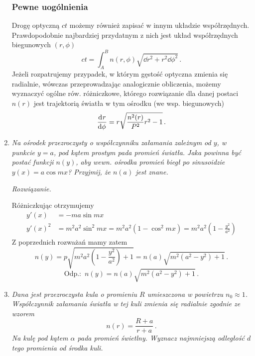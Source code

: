 \documentclass[../main.tex]{subfiles}
\begin{document}
\begin{enumerate}
\subsubsection*{Pewne uogólnienia}
Drogę optyczną \(ct\) możemy również zapisać w innym układzie współrzędnych. Prawdopodobnie
najbardziej przydatnym z nich jest układ współrzędnych biegunowych \((r,\phi)\)
\begin{equation*}
    ct=\int_{A}^{B}n(r,\phi)\sqrt{\dd{r}^2+r^2\dd{\phi}^2}\,.
\end{equation*}
Jeżeli rozpatrujemy przypadek, w którym gęstość optyczna zmienia się radialnie, wówczas
przeprowadzając analogicznie obliczenia, możemy wyznaczyć ogólne rów. różniczkowe, którego
rozwiązanie dla danej postaci \(n(r)\) jest trajektorią światła w tym ośrodku (we wsp. biegunowych)
\begin{equation*}
    \dv[]{r}{\phi}=r\sqrt{\frac{n^2(r)}{P^2}r^2-1}\,.
\end{equation*}

\item \textit{Na ośrodek przezroczysty o współczynniku załamania zależnym od \(y\), w punkcie
\(y=a\), pod kątem prostym pada promień światła. Jaka powinna być postać funkcji \(n(y)\), aby wewn.
ośrodka promień biegł po sinusoidzie \(y(x)=a\cos mx\)? Przyjmij, że \(n(a)\) jest znane.}
\medskip

\textit{Rozwiązanie.}
\medskip

Różniczkując otrzymujemy 
\begin{equation*}
\begin{split}
    y'(x)&=-ma\sin mx\\
    y'(x)^2&=m^2a^2\sin^2mx=m^2a^2(1-\cos^2 mx)=m^2a^2\left(1-\frac{y^2}{a^2}\right)
\end{split}
\end{equation*}
Z poprzednich rozważań mamy zatem
\begin{equation*}
    n(y)=p\sqrt{m^2a^2\left(1-\frac{y^2}{a^2}\right)+1}=n(a)\sqrt{m^2\left(a^2-y^2\right)+1}\,.
\end{equation*}
\begin{equation*}
    \text{Odp.: }\,n(y)=n(a)\sqrt{m^2\left(a^2-y^2\right)+1}\,.
\end{equation*}
\item
\noindent\textit{Dana jest przezroczysta kula o promieniu \(R\) umieszczona w powietrzu \(n_0\approx
1\). Współczynnik załamania światła w tej kuli zmienia się radialnie zgodnie ze wzorem
\begin{equation*}
    n(r)=\frac{R+a}{r+a}\,.
\end{equation*}
Na kulę pod kątem \(\alpha\) pada promień świetlny. Wyznacz najmniejszą odległość \(d\) tego
promienia od środka kuli.}
\medskip


\end{enumerate}
\end{document}
